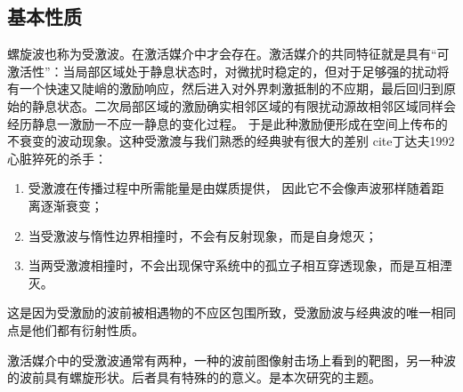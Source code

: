 \subsection{基本性质}
螺旋波也称为受激波。在激活媒介中才会存在。激活媒介的共同特征就是具有“可激活性”：当局部区域处于静息状态时，对微扰时稳定的，但对于足够强的扰动将有一个快速又陡峭的激励响应，然后进入对外界刺激抵制的不应期，最后回归到原始的静息状态。二次局部区域的激励确实相邻区域的有限扰动源故相邻区域同样会经历静息一激励一不应一静息的变化过程。 于是此种激励便形成在空间上传布的不衰变的波动现象。这种受激渡与我们熟悉的经典驶有很大的差别 cite{丁达夫1992心脏猝死的杀手}：
\begin{enumerate}
  \item 受激渡在传播过程中所需能量是由媒质提供， 因此它不会像声波邪样随着距离逐渐衰变；
  \item 当受激波与惰性边界相撞时，不会有反射现象，而是自身熄灭；
  \item 当两受激渡相撞时，不会出现保守系统中的孤立子相互穿透现象，而是互相湮灭。
\end{enumerate}
这是因为受激励的波前被相遇物的不应区包围所致，受激励波与经典波的唯一相同点是他们都有衍射性质。

激活媒介中的受激波通常有两种，一种的波前图像射击场上看到的靶图，另一种波的波前具有螺旋形状。后者具有特殊的的意义。是本次研究的主题。
